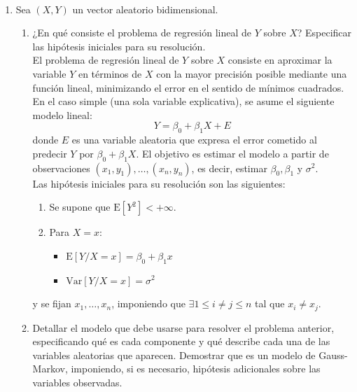 \documentclass[12pt]{article}
\newcommand{\E}{\mathrm{E}}
\newcommand{\V}{\mathrm{Var}}
\begin{document}
    \begin{ejercicio}
        \ \\
        \begin{enumerate}[label=\alph*)]
            \item Sea $(X,Y)$ un vector aleatorio bidimensional.
                \begin{enumerate}[label=\alph*)]
                    \item ¿En qué consiste el problema de regresión lineal de $Y$ sobre $X$? 
                    Especificar las hipótesis iniciales para su resolución. \\

                    El problema de regresión lineal de $Y$ sobre $X$ consiste en aproximar
                    la variable $Y$ en términos de $X$ con la mayor precisión posible
                    mediante una función lineal, minimizando el error en el sentido
                    de mínimos cuadrados. En el caso simple (una sola variable explicativa),
                    se asume el siguiente modelo lineal:
                    $$Y = \beta_0 + \beta_1 X + E$$
                    donde $E$ es una variable aleatoria que expresa el error cometido
                    al predecir $Y$ por $\beta_0 + \beta_1 X$. El objetivo es 
                    estimar el modelo a partir de observaciones $(x_1, y_1), \ldots,
                    (x_n, y_n)$, es decir, estimar $\beta_0, \beta_1$ y $\sigma^2$. \\

                    Las hipótesis iniciales para su resolución son las siguientes:
                    \begin{enumerate}
                        \item Se supone que $\E[Y^2] < +\infty$.
                        \item Para $X = x$:
                        \begin{itemize}
                            \item $\E[Y / X = x] = \beta_0 + \beta_1 x$
                            \item $\V[Y / X = x] = \sigma^2$
                        \end{itemize}
                    \end{enumerate}
                    y se fijan $x_1, \ldots, x_n$, imponiendo que $\exists 1 \leq i\neq j \leq n$
                    tal que $x_i \neq x_j$. \\

                    \item Detallar el modelo que debe usarse para resolver el problema anterior, 
                    especificando qué es cada componente y qué describe cada una de las variables 
                    aleatorias que aparecen. Demostrar que es un modelo de Gauss-Markov, imponiendo, 
                    si es necesario, hipótesis adicionales sobre las variables observadas. \\


\end{enumerate}
\end{enumerate}
\end{ejercicio}
\end{document}
